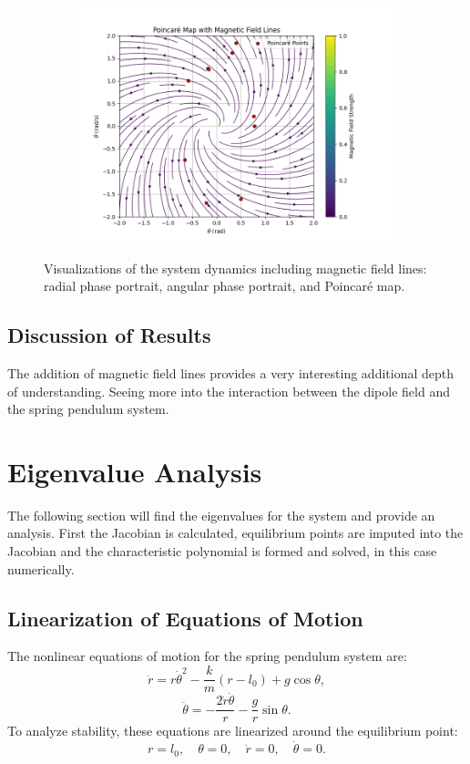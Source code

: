 \documentclass[12pt]{article}
\begin{document}
\begin{figure}[h!]
\begin{subfigure}{0.28\textwidth}
        \centering
        \includegraphics[width=\textwidth]{poincare_map_fieldLines.png}
        \label{fig:poincare_map}
    \end{subfigure}
    \caption{Visualizations of the system dynamics including magnetic field lines: radial phase portrait, angular phase portrait, and Poincaré map.}
    \label{fig:system_dynamics_visualizations}
\end{figure}

\subsection{Discussion of Results}
The addition of magnetic field lines provides a very interesting additional depth of understanding. Seeing more into the interaction between the dipole field and the spring pendulum system. 

\section{Eigenvalue Analysis}

The following section will find the eigenvalues for the system and provide an analysis. First the Jacobian is calculated, equilibrium points are imputed into the Jacobian and the characteristic polynomial is formed and solved, in this case numerically.

\subsection{Linearization of Equations of Motion}
The nonlinear equations of motion for the spring pendulum system are:
\[
\ddot{r} = r \dot{\theta}^2 - \frac{k}{m}(r - l_0) + g \cos\theta,
\]
\[
\ddot{\theta} = -\frac{2 \dot{r} \dot{\theta}}{r} - \frac{g}{r} \sin\theta.
\]
To analyze stability, these equations are linearized around the equilibrium point:
\[
r = l_0, \quad \theta = 0, \quad \dot{r} = 0, \quad \dot{\theta} = 0.
\]
\end{document}
